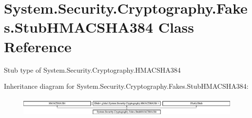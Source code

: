 \hypertarget{class_system_1_1_security_1_1_cryptography_1_1_fakes_1_1_stub_h_m_a_c_s_h_a384}{\section{System.\-Security.\-Cryptography.\-Fakes.\-Stub\-H\-M\-A\-C\-S\-H\-A384 Class Reference}
\label{class_system_1_1_security_1_1_cryptography_1_1_fakes_1_1_stub_h_m_a_c_s_h_a384}
}


Stub type of System.\-Security.\-Cryptography.\-H\-M\-A\-C\-S\-H\-A384 


Inheritance diagram for System.\-Security.\-Cryptography.\-Fakes.\-Stub\-H\-M\-A\-C\-S\-H\-A384\-:\begin{figure}[H]
\begin{center}
\leavevmode
\includegraphics[height=1.003584cm]{class_system_1_1_security_1_1_cryptography_1_1_fakes_1_1_stub_h_m_a_c_s_h_a384}
\end{center}
\end{figure}
